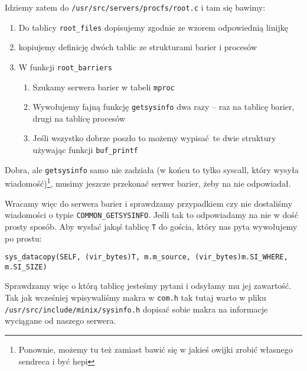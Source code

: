 Idziemy zatem do \texttt{/usr/src/servers/procfs/root.c} i tam się bawimy:
\begin{enumerate}
	\item Do tablicy \texttt{root\_files} dopisujemy zgodnie ze wzorem odpowiednią linijkę
	\item kopiujemy definicję dwóch tablic ze strukturami barier i procesów\
	\item W funkcji \texttt{root\_barriers}
	      \begin{enumerate}
		      \item Szukamy serwera barier w tabeli \texttt{mproc}
		      \item Wywołujemy fajną funkcję \texttt{getsysinfo} dwa razy -- raz na tablicę barier, drugi na tablicę procesów
		      \item Jeśli wszystko dobrze poszło to możemy wypisać te dwie struktury używając funkcji \texttt{buf\_printf}
	      \end{enumerate}
\end{enumerate}

Dobra, ale \texttt{getsysinfo} samo nie zadziała (w końcu to tylko syscall, który wysyła wiadomość)\footnote{Ponownie, możemy tu też zamiast bawić się w jakieś owijki zrobić własnego sendreca i być hepi}, musimy jeszcze przekonać serwer barier, żeby na nie odpowiadał.

Wracamy więc do serwera barier i sprawdzamy przypadkiem czy nie dostaliśmy wiadomości o typie \texttt{COMMON\_GETSYSINFO}.
Jeśli tak to odpowiadamy na nie w dość prosty sposób.
Aby wysłać jakąś tablicę \texttt{T} do gościa, który nas pyta wywołujemy po prostu:

\texttt{sys\_datacopy(SELF, (vir\_bytes)T, m.m\_source, (vir\_bytes)m.SI\_WHERE, m.SI\_SIZE)}

Sprawdzamy więc o którą tablicę jesteśmy pytani i odsyłamy mu jej zawartość.
Tak jak wcześniej wpisywaliśmy makra w \texttt{com.h} tak tutaj warto w pliku\\
\texttt{/usr/src/include/minix/sysinfo.h} dopisać sobie makra na informacje wyciągane od naszego serwera.
